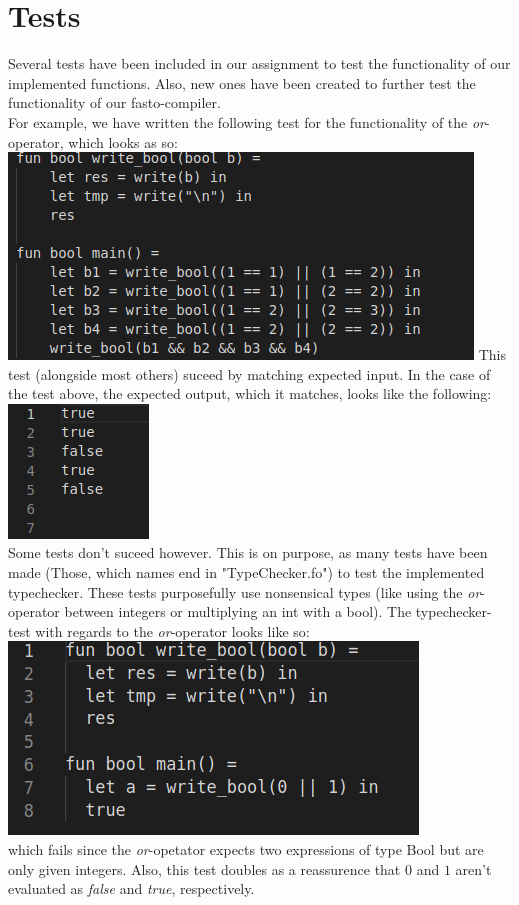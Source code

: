 \section{Tests}
Several tests have been included in our assignment to test the functionality of our implemented functions. Also, new ones have been created to further test the functionality of our fasto-compiler.\\
For example, we have written the following test for the functionality of the \textit{or}-operator, which looks as so:\\
\includegraphics[width=\linewidth]{Materials/Tests/OrTest}
This test (alongside most others) suceed by matching expected input. In the case of the test above, the expected output, which it matches, looks like the following:\\
\includegraphics[width=0.4\linewidth]{Materials/Tests/OrExpected}\\
Some tests don't suceed however. This is on purpose, as many tests have been made (Those, which names end in "TypeChecker.fo") to test the implemented typechecker. These tests purposefully use nonsensical types (like using the \textit{or}-operator between integers or multiplying an int with a bool). The typechecker-test with regards to the \textit{or}-operator looks like so:\\
\includegraphics[width=\linewidth]{Materials/Tests/OrTypeCheck}\\
which fails since the \textit{or}-opetator expects two expressions of type Bool but are only given integers. Also, this test doubles as a reassurence that $0$ and $1$ aren't evaluated as \textit{false} and \textit{true}, respectively. 
